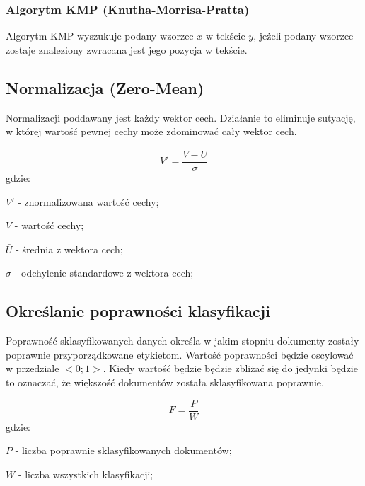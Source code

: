 \documentclass{classrep}
\begin{document}
\subsubsection{Algorytm KMP (Knutha-Morrisa-Pratta)}
Algorytm KMP wyszukuje podany wzorzec $x$ w tekście $y$, jeżeli podany wzorzec zostaje znaleziony zwracana jest jego
pozycja w tekście.

\subsection{Normalizacja (Zero-Mean)}
Normalizacji poddawany jest każdy wektor cech. Działanie to eliminuje sutyację, w której wartość pewnej
cechy może zdominować cały wektor cech.

    \begin{equation}
        V'=\frac{V-\bar{U}}{\sigma}
    \end{equation}
    gdzie:\\
    \begin{description}
        \item $V'$ - znormalizowana wartość cechy;
        \item $V$ - wartość cechy;
        \item $\bar{U}$ - średnia z wektora cech;
        \item $\sigma$ - odchylenie standardowe z wektora cech;
    \end{description}

\subsection{Określanie poprawności klasyfikacji} \label{poprawnosc_klasyfikacji}
Poprawność sklasyfikowanych danych określa w jakim stopniu dokumenty zostały poprawnie przyporządkowane etykietom.
Wartość poprawności będzie oscylować w przedziale $<0;1>$. Kiedy wartość będzie będzie zbliżać się do jedynki będzie
to oznaczać, że większość dokumentów została sklasyfikowana poprawnie.

\begin{equation}
    F=\frac{P}{W}
\end{equation}
gdzie:\\
\begin{description}
    \item $P$ - liczba poprawnie sklasyfikowanych dokumentów;
    \item $W$ - liczba wszystkich klasyfikacji;
\end{description}
\end{document}
